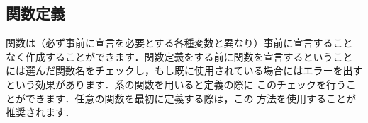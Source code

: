 \documentclass[uplatex,dvipdfmx,full,kernel]{wtpl3doc}
\begin{document}
\begin{documentation}
\subsection{関数定義}

関数は（必ず事前に宣言を必要とする各種変数と異なり）事前に宣言すること
なく作成することができます．関数定義をする前に関数を宣言するということ
には選んだ関数名をチェックし，もし既に使用されている場合にはエラーを出す
という効果があります．系の関数を用いると定義の際に
このチェックを行うことができます．任意の関数を最初に定義する際は，この
方法を使用することが推奨されます．


\end{documentation}
\end{document}

